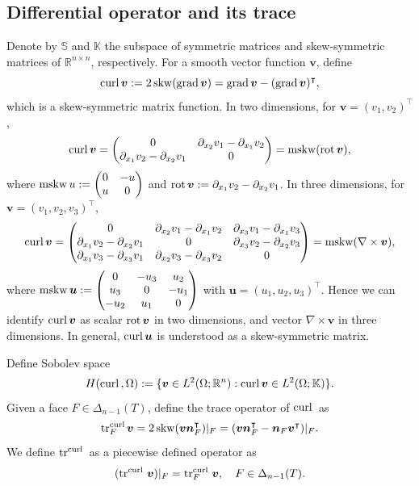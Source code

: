 \documentclass[mathpazo]{cicp}
\begin{document}
\subsection{Differential operator and its trace}
Denote by $\mathbb S$ and $\mathbb K$ the subspace of symmetric matrices and skew-symmetric matrices of $\mathbb R^{n\times n}$, respectively. For a smooth vector function $\boldsymbol{v}$, define
$$
{\rm curl\,}\boldsymbol{v}:=2\operatorname{skw}({\rm grad\,}\boldsymbol{v}) = {\rm grad\,}\boldsymbol{v} - ({\rm grad\,}\boldsymbol{v})^{\intercal},
$$
which is a skew-symmetric matrix function. In two dimensions, for $\boldsymbol{v}=(v_1, v_2)^{\intercal}$,
$$
{\rm curl\,}\boldsymbol{v}=\begin{pmatrix}
0 & \partial_{x_2}v_1-\partial_{x_1}v_2 \\
\partial_{x_1}v_2-\partial_{x_2}v_1 & 0
\end{pmatrix}=\operatorname{mskw}(\operatorname*{rot}\boldsymbol{v}),
$$
where
$
\operatorname{mskw} u:=\begin{pmatrix}
0 & -u \\
u & 0
\end{pmatrix}$ and $\operatorname*{rot}\boldsymbol{v}:=\partial_{x_1}v_2-\partial_{x_2}v_1$.
In three dimensions, for $\boldsymbol{v}=(v_1, v_2, v_3)^{\intercal}$,
$$
{\rm curl\,}\boldsymbol{v}=\begin{pmatrix}
0 & \partial_{x_2}v_1-\partial_{x_1}v_2 & \partial_{x_3}v_1-\partial_{x_1}v_3 \\
\partial_{x_1}v_2-\partial_{x_2}v_1 & 0 & \partial_{x_3}v_2-\partial_{x_2}v_3 \\
\partial_{x_1}v_3-\partial_{x_3}v_1 & \partial_{x_2}v_3-\partial_{x_3}v_2 & 0 
\end{pmatrix}=\operatorname{mskw}(\nabla\times\boldsymbol{v}),
$$
where
$
\operatorname{mskw} \boldsymbol{u}:=\begin{pmatrix}
 0 & -u_3 & u_2 \\
u_3 & 0 & - u_1\\
-u_2 & u_1 & 0
\end{pmatrix}$ with $\boldsymbol{u}=(u_1, u_2, u_3)^{\intercal}$.
Hence we can identify ${\rm curl\,}\boldsymbol{v}$ as scalar $\operatorname*{rot}\boldsymbol{v}$ in two dimensions, and vector $\nabla\times\boldsymbol{v}$ in three dimensions. In general, ${\rm curl\,} \boldsymbol u$ is understood as a skew-symmetric matrix. 


Define Sobolev space
\begin{equation*}
H({\rm curl\,},\Omega):=\{\boldsymbol{v}\in L^2(\Omega;\mathbb R^n): {\rm curl\,}\boldsymbol{v}\in L^2(\Omega;\mathbb K)\}.
\end{equation*}
Given a face $F\in \Delta_{n-1}(T)$, define the trace operator of ${\rm curl\,}$ as
$$
{\rm tr}_F^{{\rm curl\,}}\boldsymbol v=2\operatorname{skw}(\boldsymbol{v}\boldsymbol{n}_F^{\intercal})|_F = (\boldsymbol{v}\boldsymbol{n}_F^{\intercal} - \boldsymbol{n}_F\boldsymbol{v}^{\intercal})|_F.
$$
We define $\operatorname{tr}^{{\rm curl\,}}$ as a piecewise defined operator as $$(\operatorname{tr}^{{\rm curl\,}}\boldsymbol v) |_F = \operatorname{tr}^{{\rm curl\,}}_F\boldsymbol v, \quad F\in \Delta_{n-1}(T).$$
\end{document}
